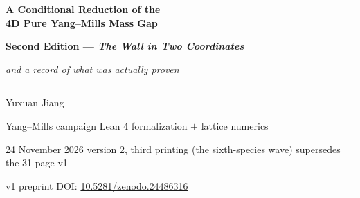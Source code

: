 \documentclass[11pt,a4paper]{article}
\begin{document}
\begin{center}
  \vspace*{0.2cm}
  {\LARGE\bfseries A Conditional Reduction of the\\[2pt] 4D Pure Yang--Mills Mass Gap\par}
  \vspace{0.3em}
  {\large\bfseries Second Edition --- \emph{The Wall in Two Coordinates}\par}
  \vspace{0.3em}
  {\large\itshape and a record of what was actually proven\par}
  \vspace{0.8em}
  \rule{0.56\textwidth}{0.6pt}\par
  \vspace{0.55em}
  {\large Yuxuan Jiang\par}
  \vspace{0.55em}
  {\small\color{black!60} Yang--Mills campaign \textperiodcentered{} Lean 4 formalization $+$ lattice numerics\par}
  \vspace{0.15em}
  {\small\color{black!60} 24 November 2026 \textperiodcentered{} version 2, third printing
   (the sixth-species wave) \textperiodcentered{} supersedes the 31-page v1\par}
  \vspace{0.15em}
  {\small\color{black!60} v1 preprint DOI:
   \href{https://doi.org/10.5281/zenodo.24486316}{10.5281/zenodo.24486316}\par}
\end{center}

\vspace{0.2em}
\end{document}
